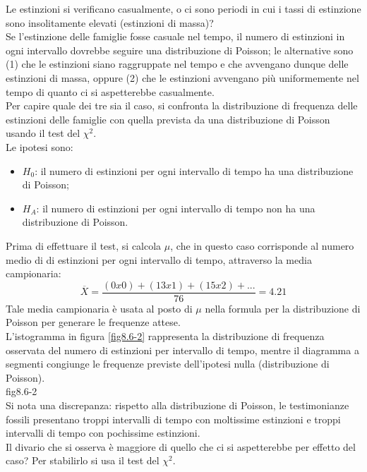 \documentclass[drafts, 10pt]{book}
\newcounter{example}[section]
\begin{document}
\begin{example}
\begin{table}[H]
\begin{tabular}{c|c}
        \hline
        \end{tabular}
        \caption{}
        \label{tabestinzioni}
\end{table}\noindent
Le estinzioni si verificano casualmente, o ci sono periodi in cui i tassi di estinzione sono insolitamente elevati (estinzioni di massa)?
\\
Se l'estinzione delle famiglie fosse casuale nel tempo, il numero di estinzioni in ogni intervallo dovrebbe seguire una distribuzione di Poisson; le alternative sono (1) che le estinzioni siano raggruppate nel tempo e che avvengano dunque delle estinzioni di massa, oppure (2) che le estinzioni avvengano più uniformemente nel tempo di quanto ci si aspetterebbe casualmente.
\\
Per capire quale dei tre sia il caso, si confronta la distribuzione di frequenza delle estinzioni delle famiglie con quella prevista da una distribuzione di Poisson usando il test del $\chi^2$.
\\
Le ipotesi sono:
\begin{itemize}
    \item $H_0$: il numero di estinzioni per ogni intervallo di tempo ha una distribuzione di Poisson;
    \item $H_A$: il numero di estinzioni per ogni intervallo di tempo non ha una distribuzione di Poisson.
\end{itemize}
Prima di effettuare il test, si calcola $\mu$, che in questo caso corrisponde al numero medio di di estinzioni per ogni intervallo di tempo, attraverso la media campionaria:
\begin{equation}
\overline{X} = \frac{(0x0)+(13x1)+(15x2)+...}{76} = 4.21
\end{equation}
Tale media campionaria è usata al posto di $\mu$ nella formula per la distribuzione di Poisson per generare le frequenze attese.
\\
L'istogramma in figura \ref{fig8.6-2} rappresenta la distribuzione di frequenza osservata del numero di estinzioni per intervallo di tempo, mentre il diagramma a segmenti congiunge le frequenze previste dell'ipotesi nulla (distribuzione di Poisson).
\\
fig8.6-2 \label{fig8.6-2}
\\
Si nota una discrepanza: rispetto alla distribuzione di Poisson, le testimonianze fossili presentano troppi intervalli di tempo con moltissime estinzioni e troppi intervalli di tempo con pochissime estinzioni.
\\
Il divario che si osserva è maggiore di quello che ci si aspetterebbe per effetto del caso? Per stabilirlo si usa il test del $\chi^2$.

\end{example}
\end{document}
